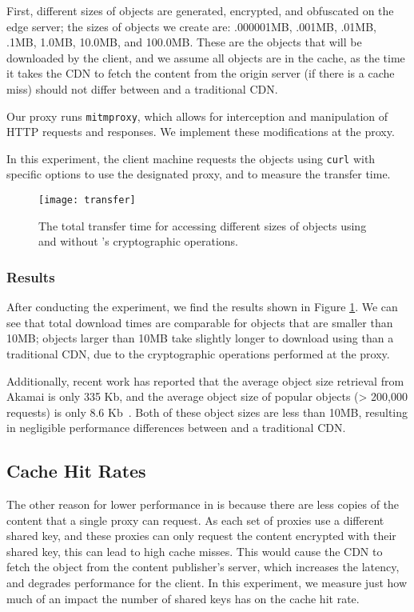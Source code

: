 First, different sizes of objects are generated, encrypted, and obfuscated on the edge server; the sizes of objects we create are: 
.000001MB, .001MB, .01MB, .1MB, 1.0MB, 10.0MB, and 100.0MB.  These are the objects that will be downloaded by the client, and we 
assume all objects are in the cache, as the time it takes the CDN to fetch the content from the origin server (if there is a cache 
miss) should not differ between \system{} and a traditional CDN. 

Our proxy runs {\tt mitmproxy}, which allows for interception and manipulation of HTTP requests and responses.  We implement 
these modifications at the proxy.  

In this experiment, the client machine requests the objects using {\tt curl} with specific options to use the designated proxy, 
and to measure the transfer time.  

\begin{figure}[t]
\centering
\texttt{[image: transfer]}
\caption{The total transfer time for accessing different sizes of objects using \system{} and without \system{}'s cryptographic operations.}
\label{fig:transfer}
\end{figure}

\subsubsection{Results}
After conducting the experiment, we find the results shown in Figure \ref{fig:transfer}.  We can see that total download times are comparable 
for objects that are smaller than 10MB; objects larger than 10MB take slightly longer to download using \system{} than a traditional CDN, 
due to the cryptographic operations performed at the proxy.  

Additionally, recent work has reported that the average object size retrieval from Akamai is only 335 Kb, and the average object size 
of popular objects (> 200,000 requests) is only 8.6 Kb~\cite{berger2016achieving}.  Both of these object sizes are less than 10MB, resulting in negligible 
performance differences between \system{} and a traditional CDN.

\subsection{Cache Hit Rates}
The other reason for lower performance in \system{} is because there are less copies of the content that a single proxy can request.  As each set 
of proxies use a different shared key, and these proxies can only request the content encrypted with their shared key, this can lead to high cache misses.  
This would cause the CDN to fetch the object from the content publisher's server, which increases the latency, and degrades performance for the client.  
In this experiment, we measure just how much of an impact the number of shared keys has on the cache hit rate.

